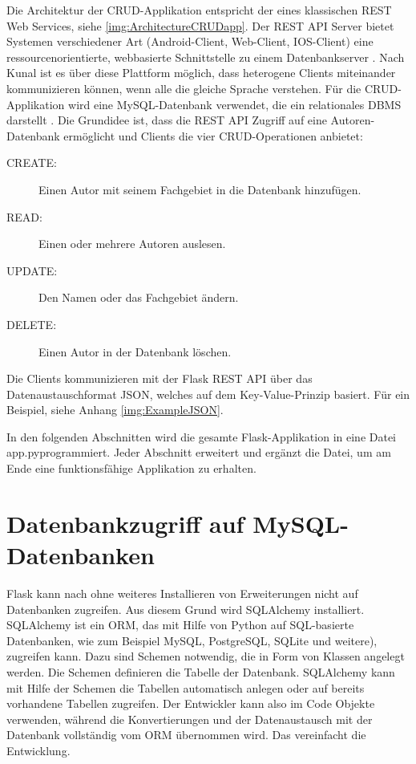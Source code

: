 \documentclass[a4paper,titlepage,halfparskip,12pt,listof=numbered]{scrreprt}
\begin{document}
\begin{onehalfspacing}
Die Architektur der CRUD-Applikation entspricht der eines klassischen \ac{REST} Web Services, siehe \autoref{img:ArchitectureCRUDapp}. Der \ac{REST} \ac{API} Server bietet Systemen verschiedener Art (Android-Client, Web-Client, IOS-Client) eine ressourcenorientierte, webbasierte Schnittstelle zu einem Datenbankserver \cite[S.5]{pythonFlaskREST}. Nach Kunal \cite[S.5]{pythonFlaskREST} ist es über diese Plattform möglich, dass heterogene Clients miteinander kommunizieren können, wenn alle die gleiche Sprache verstehen. Für die CRUD-Applikation wird eine MySQL-Datenbank verwendet, die ein relationales \ac{DBMS} darstellt \cite[S.28]{pythonFlaskREST}. Die Grundidee ist, dass die \ac{REST} \ac{API} Zugriff auf eine Autoren-Datenbank ermöglicht und Clients die vier CRUD-Operationen anbietet:

\begin{description}
\item[CREATE:] Einen Autor mit seinem Fachgebiet in die Datenbank hinzufügen.
\item[READ:] Einen oder mehrere Autoren auslesen.
\item[UPDATE:] Den Namen oder das Fachgebiet ändern.
\item[DELETE:] Einen Autor in der Datenbank löschen.
\end{description}

Die Clients kommunizieren mit der Flask \ac{REST} \ac{API} über das Datenaustauschformat \ac{JSON}, welches auf dem Key-Value-Prinzip basiert. Für ein Beispiel, siehe Anhang \autoref{img:ExampleJSON}.

In den folgenden Abschnitten wird die gesamte Flask-Applikation in eine Datei \glqq app.py\grqq programmiert. Jeder Abschnitt erweitert und ergänzt die Datei, um am Ende eine funktionsfähige Applikation zu erhalten.

\section{Datenbankzugriff auf MySQL-Datenbanken}
\label{sec:DBzugriffFlask}

Flask kann nach \cite{flaskMicroDescription} ohne weiteres Installieren von Erweiterungen nicht auf Datenbanken zugreifen. Aus diesem Grund wird SQLAlchemy installiert. SQLAlchemy ist ein \ac{ORM}, das mit Hilfe von Python auf SQL-basierte Datenbanken, wie zum Beispiel MySQL, PostgreSQL, SQLite und weitere), zugreifen kann. Dazu sind Schemen notwendig, die in Form von Klassen angelegt werden. Die Schemen definieren die Tabelle der Datenbank. SQLAlchemy kann mit Hilfe der Schemen die Tabellen automatisch anlegen oder auf bereits vorhandene Tabellen zugreifen. Der Entwickler kann also im Code Objekte verwenden, während die Konvertierungen und der Datenaustausch mit der Datenbank vollständig vom \ac{ORM} übernommen wird. Das vereinfacht die Entwicklung.\cite[S.29ff]{pythonFlaskREST}


\end{onehalfspacing}
\end{document}
